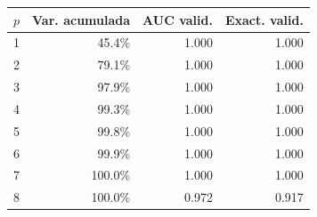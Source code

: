 \footnotesize
\begin{tabular}{crrr}
\toprule
$p$ & Var. acumulada & AUC valid. & Exact. valid. \\
\midrule
1 & 45.4\% & 1.000 & 1.000 \\
2 & 79.1\% & 1.000 & 1.000 \\
3 & 97.9\% & 1.000 & 1.000 \\
4 & 99.3\% & 1.000 & 1.000 \\
5 & 99.8\% & 1.000 & 1.000 \\
6 & 99.9\% & 1.000 & 1.000 \\
7 & 100.0\% & 1.000 & 1.000 \\
8 & 100.0\% & 0.972 & 0.917 \\
\bottomrule
\end{tabular}
